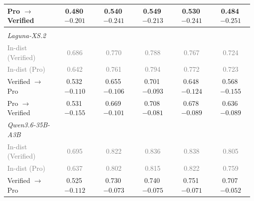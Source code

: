 \begin{table}[t]
\begin{tabular}{lccccc}
\qquad{}Pro $\rightarrow$ Verified & 0.480\,{\scriptsize \textcolor{red!70!black}{$-0.201$}} & 0.540\,{\scriptsize \textcolor{red!70!black}{$-0.241$}} & 0.549\,{\scriptsize \textcolor{red!70!black}{$-0.213$}} & 0.530\,{\scriptsize \textcolor{red!70!black}{$-0.241$}} & 0.484\,{\scriptsize \textcolor{red!70!black}{$-0.251$}}  \\
\midrule
\multicolumn{6}{l}{\textit{\Semantic{}}} \\
\quad{}\textit{Laguna-XS.2} \\
\qquad{}\textcolor{gray}{\small In-dist (Verified)} & \textcolor{gray}{\small 0.686} & \textcolor{gray}{\small 0.770} & \textcolor{gray}{\small 0.788} & \textcolor{gray}{\small 0.767} & \textcolor{gray}{\small 0.724} \\
\qquad{}\textcolor{gray}{\small In-dist (Pro)} & \textcolor{gray}{\small 0.642} & \textcolor{gray}{\small 0.761} & \textcolor{gray}{\small 0.794} & \textcolor{gray}{\small 0.772} & \textcolor{gray}{\small 0.723} \\
\qquad{}Verified $\rightarrow$ Pro & 0.532\,{\scriptsize \textcolor{red!70!black}{$-0.110$}} & 0.655\,{\scriptsize \textcolor{red!70!black}{$-0.106$}} & 0.701\,{\scriptsize \textcolor{red!70!black}{$-0.093$}} & 0.648\,{\scriptsize \textcolor{red!70!black}{$-0.124$}} & 0.568\,{\scriptsize \textcolor{red!70!black}{$-0.155$}}  \\
\qquad{}Pro $\rightarrow$ Verified & 0.531\,{\scriptsize \textcolor{red!70!black}{$-0.155$}} & 0.669\,{\scriptsize \textcolor{red!70!black}{$-0.101$}} & 0.708\,{\scriptsize \textcolor{red!70!black}{$-0.081$}} & 0.678\,{\scriptsize \textcolor{red!70!black}{$-0.089$}} & 0.636\,{\scriptsize \textcolor{red!70!black}{$-0.089$}}  \\
\quad{}\textit{Qwen3.6-35B-A3B} \\
\qquad{}\textcolor{gray}{\small In-dist (Verified)} & \textcolor{gray}{\small 0.695} & \textcolor{gray}{\small 0.822} & \textcolor{gray}{\small 0.836} & \textcolor{gray}{\small 0.838} & \textcolor{gray}{\small 0.805} \\
\qquad{}\textcolor{gray}{\small In-dist (Pro)} & \textcolor{gray}{\small 0.637} & \textcolor{gray}{\small 0.802} & \textcolor{gray}{\small 0.815} & \textcolor{gray}{\small 0.822} & \textcolor{gray}{\small 0.759} \\
\qquad{}Verified $\rightarrow$ Pro & 0.525\,{\scriptsize \textcolor{red!70!black}{$-0.112$}} & 0.730\,{\scriptsize \textcolor{red!70!black}{$-0.073$}} & 0.740\,{\scriptsize \textcolor{red!70!black}{$-0.075$}} & 0.751\,{\scriptsize \textcolor{red!70!black}{$-0.071$}} & 0.707\,{\scriptsize \textcolor{red!70!black}{$-0.052$}}  \\

\end{tabular}
\end{table}
